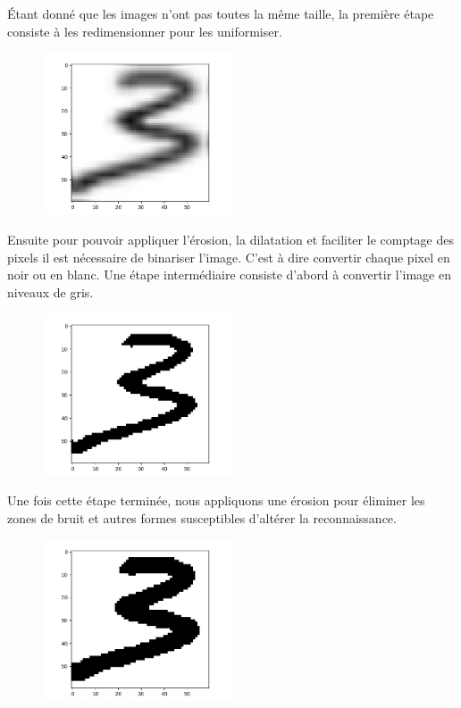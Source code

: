 \documentclass{article}
\begin{document}
Étant donné que les images n'ont pas toutes la même taille, la première étape consiste à les redimensionner pour les uniformiser.

\begin{figure}[h!]
    \centering
    \includegraphics[width=0.5\textwidth]{images/resized_picture.png}
\end{figure}

Ensuite pour pouvoir appliquer l'érosion, la dilatation et faciliter le comptage des pixels il est nécessaire de binariser l'image. C'est à dire convertir chaque pixel en noir ou en blanc. Une étape intermédiaire consiste d'abord à convertir l'image en niveaux de gris. 

\begin{figure}[h!]
    \centering
    \includegraphics[width=0.5\textwidth]{images/binarised_picture.png}
\end{figure}

Une fois cette étape terminée, nous appliquons une érosion pour éliminer les zones de bruit et autres formes susceptibles d'altérer la reconnaissance.

\begin{figure}[h!]
    \centering
    \includegraphics[width=0.5\textwidth]{images/eroded_picture.png}
\end{figure}
\end{document}
